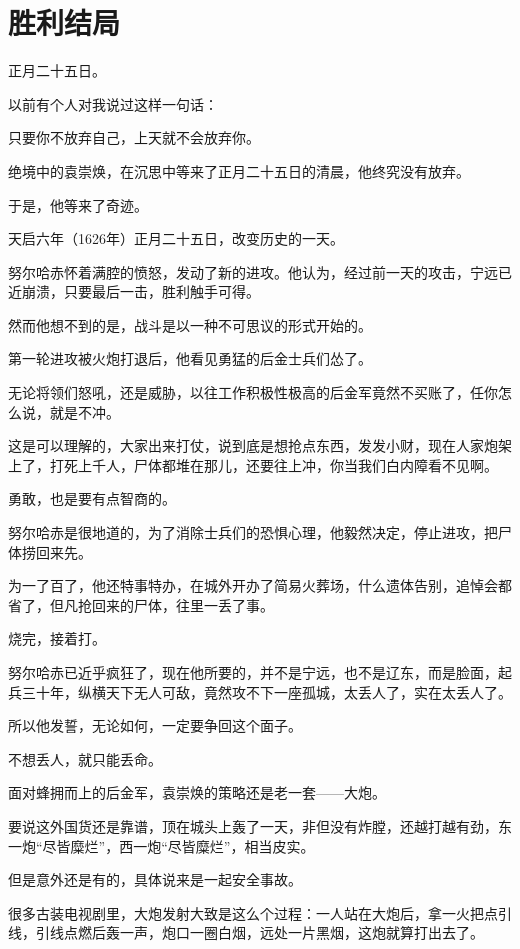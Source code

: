 \section{胜利结局}
\ifnum{}
	\begin{multicols}{\theparacolNo}
\fi
正月二十五日。

以前有个人对我说过这样一句话：

只要你不放弃自己，上天就不会放弃你。

绝境中的袁崇焕，在沉思中等来了正月二十五日的清晨，他终究没有放弃。

于是，他等来了奇迹。

天启六年（1626年）正月二十五日，改变历史的一天。

努尔哈赤怀着满腔的愤怒，发动了新的进攻。他认为，经过前一天的攻击，宁远已近崩溃，只要最后一击，胜利触手可得。

然而他想不到的是，战斗是以一种不可思议的形式开始的。

第一轮进攻被火炮打退后，他看见勇猛的后金士兵们怂了。

无论将领们怒吼，还是威胁，以往工作积极性极高的后金军竟然不买账了，任你怎么说，就是不冲。

这是可以理解的，大家出来打仗，说到底是想抢点东西，发发小财，现在人家炮架上了，打死上千人，尸体都堆在那儿，还要往上冲，你当我们白内障看不见啊。

勇敢，也是要有点智商的。

努尔哈赤是很地道的，为了消除士兵们的恐惧心理，他毅然决定，停止进攻，把尸体捞回来先。

为一了百了，他还特事特办，在城外开办了简易火葬场，什么遗体告别，追悼会都省了，但凡抢回来的尸体，往里一丢了事。

烧完，接着打。

努尔哈赤已近乎疯狂了，现在他所要的，并不是宁远，也不是辽东，而是脸面，起兵三十年，纵横天下无人可敌，竟然攻不下一座孤城，太丢人了，实在太丢人了。

所以他发誓，无论如何，一定要争回这个面子。

不想丢人，就只能丢命。

面对蜂拥而上的后金军，袁崇焕的策略还是老一套——大炮。

要说这外国货还是靠谱，顶在城头上轰了一天，非但没有炸膛，还越打越有劲，东一炮“尽皆糜烂”，西一炮“尽皆糜烂”，相当皮实。

但是意外还是有的，具体说来是一起安全事故。

很多古装电视剧里，大炮发射大致是这么个过程：一人站在大炮后，拿一火把点引线，引线点燃后轰一声，炮口一圈白烟，远处一片黑烟，这炮就算打出去了。


\end{multicols}
